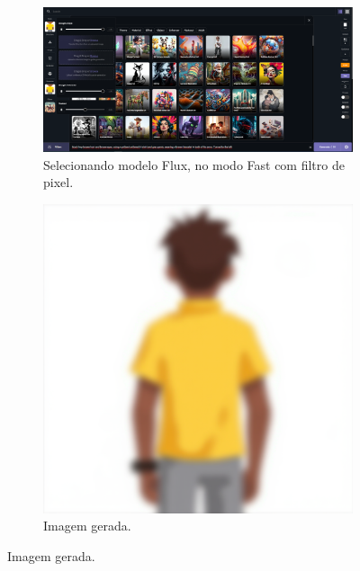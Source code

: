\begin{figure}[htbp]
    \centering
    \caption{\small Processo da utilização 9 do CGDream (Personagem)}
    \label{fig:cgDream9}
    \begin{subfigure}{0.7\linewidth}
        \includegraphics[width=1\linewidth]{figs/cgDream/tela_char_FluxFast_filtro1.PNG}
        \caption{\small Selecionando modelo Flux, no modo Fast com filtro de pixel.}
        \label{fig:cgDream9a}
    \end{subfigure}
    \begin{subfigure}{0.35\linewidth}
        \centering
        \includegraphics[width=1\linewidth]{figs/cgDream/res_char_FluxFast_filtro1.png}
        \caption{\small Imagem gerada.}
        \label{fig:cgDream9b}
    \end{subfigure}

\end{figure}
